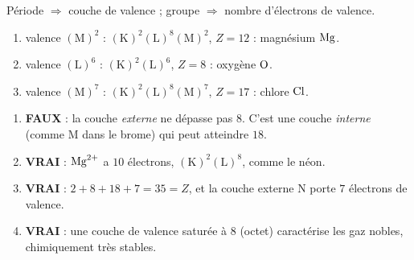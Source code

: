 \documentclass[11pt,a4paper]{article}
\begin{document}
\begin{corrige}
Période $\Rightarrow$ couche de valence ; groupe $\Rightarrow$ nombre d'électrons de valence.
\begin{enumerate}[label=\alph*)]
  \item valence $(\mathrm{M})^2$ : $(\mathrm{K})^2(\mathrm{L})^8(\mathrm{M})^2$, $Z=12$ : magnésium $\ce{Mg}$.
  \item valence $(\mathrm{L})^6$ : $(\mathrm{K})^2(\mathrm{L})^6$, $Z=8$ : oxygène $\ce{O}$.
  \item valence $(\mathrm{M})^7$ : $(\mathrm{K})^2(\mathrm{L})^8(\mathrm{M})^7$, $Z=17$ : chlore $\ce{Cl}$.
\end{enumerate}
\end{corrige}

\begin{corrige}
\begin{enumerate}[label=\alph*)]
  \item \textbf{\textcolor{attncol}{FAUX}} : la couche \emph{externe} ne dépasse pas $8$. C'est une
        couche \emph{interne} (comme M dans le brome) qui peut atteindre $18$.
  \item \textbf{\textcolor{excol}{VRAI}} : $\ce{Mg^{2+}}$ a $10$ électrons, $(\mathrm{K})^2(\mathrm{L})^8$,
        comme le néon.
  \item \textbf{\textcolor{excol}{VRAI}} : $2+8+18+7 = 35 = Z$, et la couche externe N porte $7$
        électrons de valence.
  \item \textbf{\textcolor{excol}{VRAI}} : une couche de valence saturée à $8$ (octet) caractérise les
        gaz nobles, chimiquement très stables.
\end{enumerate}
\end{corrige}
\end{document}
